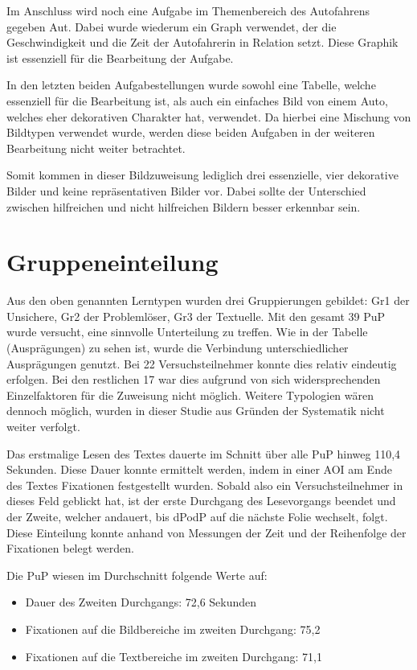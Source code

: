 Im Anschluss wird noch eine Aufgabe im Themenbereich des Autofahrens gegeben \gls{Aut}. Dabei wurde wiederum ein Graph verwendet, der die Geschwindigkeit und die Zeit der Autofahrerin in Relation setzt. Diese Graphik ist essenziell für die Bearbeitung der Aufgabe. 


In den letzten beiden Aufgabestellungen wurde sowohl eine Tabelle, welche essenziell für die Bearbeitung ist, als auch ein einfaches Bild von einem Auto, welches eher dekorativen Charakter hat, verwendet. Da hierbei eine Mischung von Bildtypen verwendet wurde, werden diese beiden Aufgaben in der weiteren Bearbeitung nicht weiter betrachtet. 

Somit kommen in dieser Bildzuweisung lediglich drei essenzielle, vier dekorative Bilder und keine repräsentativen Bilder vor. Dabei sollte der Unterschied zwischen hilfreichen und nicht hilfreichen Bildern besser erkennbar sein.


\section{Gruppeneinteilung}

Aus den oben genannten Lerntypen wurden drei Gruppierungen gebildet: \gls{Gr1} der Unsichere, \gls{Gr2} der Problemlöser, \gls{Gr3} der Textuelle. Mit den gesamt 39 \gls{PuP} wurde versucht, eine sinnvolle Unterteilung zu treffen. Wie in der Tabelle (Ausprägungen) zu sehen ist, wurde die Verbindung unterschiedlicher Ausprägungen genutzt. Bei 22 Versuchsteilnehmer konnte dies relativ eindeutig erfolgen. Bei den restlichen 17 war dies aufgrund von sich widersprechenden Einzelfaktoren für die Zuweisung nicht möglich. Weitere Typologien wären dennoch möglich, wurden in dieser Studie aus Gründen der Systematik nicht weiter verfolgt.

Das erstmalige Lesen des Textes dauerte im Schnitt über alle \gls{PuP} hinweg 110,4 Sekunden. Diese Dauer konnte ermittelt werden, indem in einer AOI am Ende des Textes Fixationen festgestellt wurden. Sobald also ein Versuchsteilnehmer in dieses Feld geblickt hat, ist der erste Durchgang des Lesevorgangs beendet und der Zweite, welcher andauert, bis \gls{dPodP} auf die nächste Folie wechselt, folgt. Diese Einteilung konnte anhand von Messungen der Zeit und der Reihenfolge der Fixationen belegt werden. 


Die \gls{PuP} wiesen im Durchschnitt folgende Werte auf:
    \begin{itemize}
        \item Dauer des Zweiten Durchgangs: 72,6 Sekunden 
        \item Fixationen auf die Bildbereiche im zweiten Durchgang: 75,2
        \item Fixationen auf die Textbereiche im zweiten Durchgang: 71,1
    \end{itemize}

